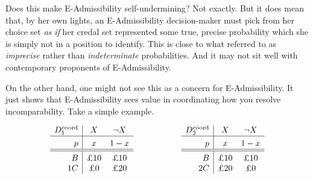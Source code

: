 \documentclass[a4paper,final]{article}
\newcommand\Tstrut{\rule{0pt}{2.6ex}}       %
\newcommand\Bstrut{\rule[-0.9ex]{0pt}{0pt}} %
\newcommand\EU{\mathrm{EU}}
\newcommand{\IB}{\mathbb{B}}
\renewcommand{\color}[1]{}
\newenvironment{CCM rewritten}
{\begingroup\color{blue}} %
{\endgroup}              %
\begin{document}


Does this make E-Admissibility self-undermining? Not exactly. But it does mean that, by her own lights, an E-Admissibility decision-maker must pick from her choice set \emph{as if} her credal set represented some true, precise probability which she is simply not in a position to identify. This is close to what \cite{levi99} referred to as \emph{imprecise} rather than \emph{indeterminate} probabilities. And it may not sit well with contemporary proponents of E-Admissibility.



	
	
	On the other hand, one might not see this as a concern for E-Admissibility. %
It just shows that E-Admissibility sees value in coordinating how you resolve incomparability.
Take a simple example.
	
	\label{eg:coord}
	$$
	\begin{array}{r|cc}
		D^{\mathrm{coord}}_1 & X & \neg X  \Bstrut \\\hline \Tstrut		p & x & 1-x \Bstrut \\\hline \hline\Tstrut 
		B & \text{\pounds 10} & \text{\pounds 10}   \\
		1C & \text{\pounds 0} & \text{\pounds 20} 
	\end{array}\hspace{20mm}
	\begin{array}{r|cc}
		D^{\mathrm{coord}}_2 & X & \neg X  \Bstrut \\\hline \Tstrut		p & x & 1-x \Bstrut \\\hline \hline\Tstrut 
		B & \text{\pounds 10} & \text{\pounds 10}   \\
		2C & \text{\pounds 20} & \text{\pounds 0} 
	\end{array}
	$$
	
\end{document}
